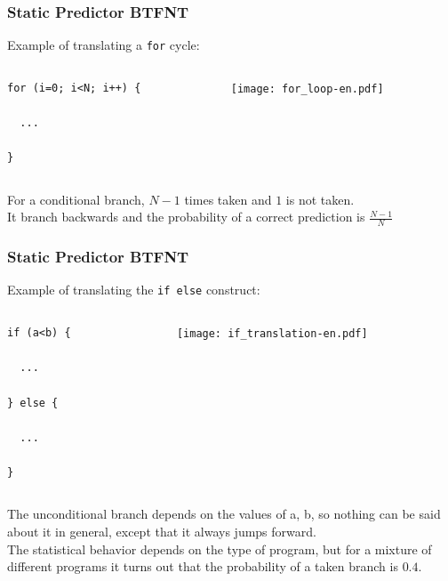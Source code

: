 \documentclass{beamer}
\begin{document}
\begin{frame}[fragile]
\frametitle{Static Predictor BTFNT}

Example of translating a \texttt{for} cycle:

\begin{columns}[T]
\begin{column}{0.4\textwidth}
\begin{verbatim}
for (i=0; i<N; i++) {

  ...
  
}
\end{verbatim}
\end{column}
\begin{column}{0.6\textwidth}
\texttt{[image: for\_loop-en.pdf]}
\end{column}
\end{columns}
\bigskip
For a conditional branch, $N-1$ times taken and $1$ is not taken.\\
It branch backwards and the probability of a correct prediction is $\frac{N-1}{N}$

\end{frame}

\begin{frame}[fragile]
\frametitle{Static Predictor BTFNT}

Example of translating the \texttt{if else} construct:

\begin{columns}[T]
\begin{column}{0.4\textwidth}
\begin{verbatim}
if (a<b) {
  
  ...

} else {

  ...

}
\end{verbatim}
\end{column}
\begin{column}{0.6\textwidth}
\texttt{[image: if\_translation-en.pdf]}
\end{column}
\end{columns}
\bigskip
The unconditional branch depends on the values of a, b, so nothing can be said about it in general, except that it always jumps forward.\\
The statistical behavior depends on the type of program, but for a mixture of different programs it turns out that the probability of a taken branch is $0.4$.

\end{frame}
\end{document}
